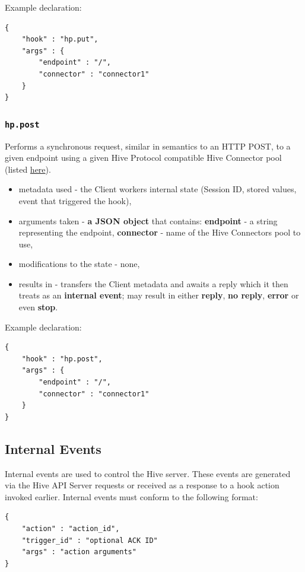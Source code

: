 \documentclass[a4paper]{article}
\begin{document}
\noindent
Example declaration:

\begin{verbatim}
{
    "hook" : "hp.put",
    "args" : {
        "endpoint" : "/",
        "connector" : "connector1"
    }
}
\end{verbatim}
\subsubsection{\texttt{hp.post}}
\label{sec-9-2-10}

Performs a synchronous request, similar in semantics to an HTTP POST, to a given endpoint using a given Hive Protocol compatible Hive Connector pool (listed \hyperref[ref-cp_connector]{here}).


\begin{itemize}
\item metadata used - the Client workers internal state (Session ID, stored values, event that triggered the hook),
\item arguments taken - \textbf{a JSON object} that contains: \textbf{endpoint} - a string representing the endpoint, \textbf{connector} - name of the Hive Connectors pool to use,
\item modifications to the state - none,
\item results in -  transfers the Client metadata and awaits a reply which it then treats as an \textbf{internal event}; may result in either \textbf{reply}, \textbf{no reply}, \textbf{error} or even \textbf{stop}.
\end{itemize}

\noindent
Example declaration:

\begin{verbatim}
{
    "hook" : "hp.post",
    "args" : {
        "endpoint" : "/",
        "connector" : "connector1"
    }
}
\end{verbatim}
\subsection{Internal Events}
\label{sec-9-3}
\label{ref-internal_events}
\label{ref-hive_events}


Internal events are used to control the Hive server. These events are generated via the Hive API Server requests or received as a response to a hook action invoked earlier. Internal events must conform to the following format:


\begin{verbatim}
{
    "action" : "action_id",
    "trigger_id" : "optional ACK ID"
    "args" : "action arguments"
}
\end{verbatim}
\end{document}
